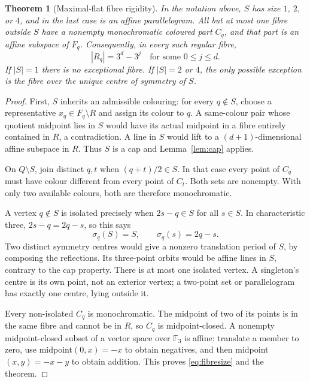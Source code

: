 \documentclass[11pt]{article}
\newtheorem{theorem}{Theorem}[section]
\theoremstyle{remark}\newtheorem{remark}[theorem]{Remark}
\newcommand{\F}{\mathbb F_3}
\begin{document}
\begin{theorem}[Maximal-flat fibre rigidity]\label{thm:normal}
In the notation above, $S$ has size $1$, $2$, or $4$, and in the last case
is an affine parallelogram. All but at most one fibre outside $S$ have a
nonempty monochromatic coloured part $C_q$, and that part is an affine
subspace of $F_q$. Consequently, in every such regular fibre,
\begin{equation}\label{eq:fibresize}
 |R_q|=3^d-3^j \quad\text{for some }0\leq j\leq d.
\end{equation}
If $|S|=1$ there is no exceptional fibre. If $|S|=2$ or $4$, the only
possible exception is the fibre over the unique centre of symmetry of $S$.
\end{theorem}
\begin{proof}
First, $S$ inherits an admissible colouring: for every $q\notin S$, choose a
representative $x_q\in F_q\setminus R$ and assign its colour to $q$. A
same-colour pair whose quotient midpoint lies in $S$ would have its actual
midpoint in a fibre entirely contained in $R$, a contradiction. A line in
$S$ would lift to a $(d+1)$-dimensional affine subspace in $R$. Thus $S$ is
a cap and Lemma~\ref{lem:cap} applies.

On $Q\setminus S$, join distinct $q,t$ when $(q+t)/2\in S$. In that case
every point of $C_q$ must have colour different from every point of $C_t$.
Both sets are nonempty. With only two available colours, both are therefore
monochromatic.

A vertex $q\notin S$ is isolated precisely when $2s-q\in S$ for all $s\in S$.
In characteristic three, $2s-q=2q-s$, so this says
\[
 \sigma_q(S)=S,\qquad \sigma_q(s)=2q-s.
\]
Two distinct symmetry centres would give a nonzero translation period of
$S$, by composing the reflections. Its three-point orbits would be affine
lines in $S$, contrary to the cap property. There is at most one isolated
vertex. A singleton's centre is its own point, not an exterior vertex;
a two-point set or parallelogram has exactly one centre, lying outside it.

Every non-isolated $C_q$ is monochromatic. The midpoint of two of its points
is in the same fibre and cannot be in $R$, so $C_q$ is midpoint-closed. A
nonempty midpoint-closed subset of a vector space over $\F$ is affine:
translate a member to zero, use midpoint$(0,x)=-x$ to obtain negatives, and
then midpoint$(x,y)=-x-y$ to obtain addition. This proves
\eqref{eq:fibresize} and the theorem.
\end{proof}
\end{document}

